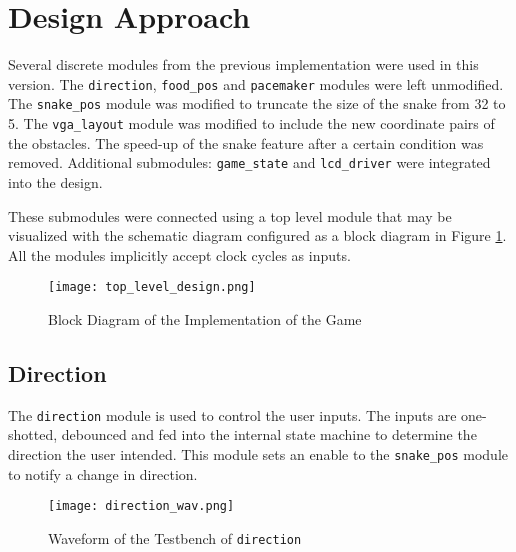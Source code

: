 \documentclass[paper=usletter, fontsize=12pt]{article}
\begin{document}
    \section{Design Approach} Several discrete modules from the previous
    implementation were used in this version. The \texttt{direction},
    \texttt{food\_pos} and \texttt{pacemaker} modules were left unmodified. The
    \texttt{snake\_pos} module was modified to truncate the size of the snake
    from 32 to 5. The \texttt{vga\_layout} module was modified to include the
    new coordinate pairs of the obstacles. The speed-up of the snake feature
    after a certain condition was removed.  Additional submodules:
    \texttt{game\_state} and \texttt{lcd\_driver} were integrated into the
    design.
 
    These submodules were connected using a top level module that may be
    visualized with the schematic diagram configured as a block diagram in
    Figure \ref{fig:schematic}. All the modules implicitly accept clock cycles
    as inputs.

    \begin{figure}[ht]
        \begin{center}
            \texttt{[image: top\_level\_design.png]}
            \caption{Block Diagram of the Implementation of the Game}
            \label{fig:schematic}
        \end{center}
    \end{figure}
    \newpage

        \subsection{Direction} The \texttt{direction} module is used to control
        the user inputs. The inputs are one-shotted, debounced and fed into the
        internal state machine to determine the direction the user intended.
        This module sets an enable to the \texttt{snake\_pos} module to notify
        a change in direction.

        \begin{figure}[ht]
            \begin{center}
                \texttt{[image: direction\_wav.png]}
                \caption{Waveform of the Testbench of \texttt{direction}}
                \label{fig:direction_wav}
            \end{center}
        \end{figure}
\end{document}

